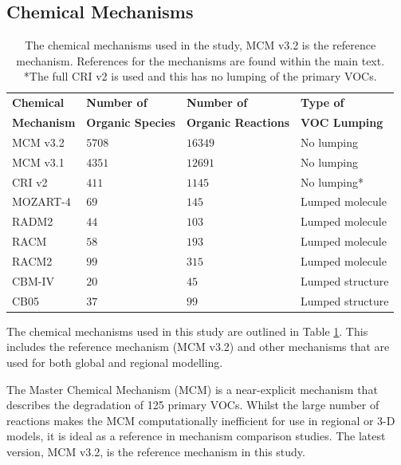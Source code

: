 
\subsection{Chemical Mechanisms} \label{ss:mechanisms}

{
    \renewcommand{\arraystretch}{1.3}
    \begin{table}
        \begin{center}
            \begin{tabular}{llll}
                \hline \hline
                \textbf{Chemical} & \textbf{Number of} & \textbf{Number of} & \textbf{Type of} \\ 
                \textbf{Mechanism} & \textbf{Organic Species} & \textbf{Organic Reactions} & \textbf{VOC Lumping} \\ \hline
                MCM v3.2 & $5708$ & $16349$ & No lumping \\ \hline
                MCM v3.1 & $4351$ & $12691$ & No lumping \\ \hline
                CRI v2 & $411$ & $1145$ & No lumping* \\ \hline
                MOZART-4 & $69$ & $145$ & Lumped molecule \\ \hline
                RADM2 & $44$ & $103$ & Lumped molecule \\ \hline
                RACM & $58$ & $193$ & Lumped molecule \\ \hline
                RACM2 & $99$ & $315$ & Lumped molecule \\ \hline
                CBM-IV & $20$ & $45$ & Lumped structure \\ \hline
                CB05 & $37$ & $99$ & Lumped structure \\ 
                \hline \hline
            \end{tabular}
        \end{center}
        \caption{The chemical mechanisms used in the study, MCM v3.2 is the reference mechanism. References for the mechanisms are found within the main text. *The full CRI v2 is used and this has no lumping of the primary VOCs.}
        \label{t:mechanisms}
    \end{table}
}

The chemical mechanisms used in this study are outlined in Table \ref{t:mechanisms}. 
This includes the reference mechanism (MCM v3.2) and other mechanisms that are used for both global and regional modelling. 

The Master Chemical Mechanism (MCM) \citep{Jenkin:1997, Jenkin:2003, Saunders:2003, Bloss:2005, MCM_Site} is a near-explicit mechanism that describes the degradation of 125 primary VOCs. 
Whilst the large number of reactions makes the MCM computationally inefficient for use in regional or 3-D models, it is ideal as a reference in mechanism comparison studies. 
The latest version, MCM v3.2, is the reference mechanism in this study.

